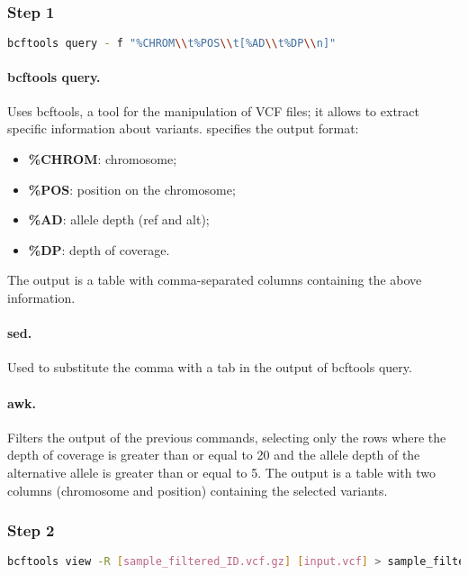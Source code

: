 \subsubsection*{Step 1}

\begin{lstlisting}[breaklines=true, language=bash]
    bcftools query - f "%CHROM\\t%POS\\t[%AD\\t%DP\\n]"
\end{lstlisting}

\paragraph{bcftools query.} Uses bcftools, a tool for the manipulation of VCF files; it allows to extract specific information about variants.  specifies the output format:

\begin{itemize}
    \item \textbf{\%CHROM}: chromosome;
    \item \textbf{\%POS}: position on the chromosome;
    \item \textbf{\%AD}: allele depth (ref and alt);
    \item \textbf{\%DP}: depth of coverage.
\end{itemize}

The output is a table with comma-separated columns containing the above information.

\paragraph{sed.} Used to substitute the comma with a tab in the output of bcftools query.

\paragraph{awk.} Filters the output of the previous commands, selecting only the rows where the depth of coverage is greater than or equal to 20 and the allele depth of the alternative allele is greater than or equal to 5. The output is a table with two columns (chromosome and position) containing the selected variants.

\subsubsection*{Step 2}
\begin{lstlisting}[breaklines=true, language=bash]
    bcftools view -R [sample_filtered_ID.vcf.gz] [input.vcf] > sample_filtered.vcf.gz
\end{lstlisting}

